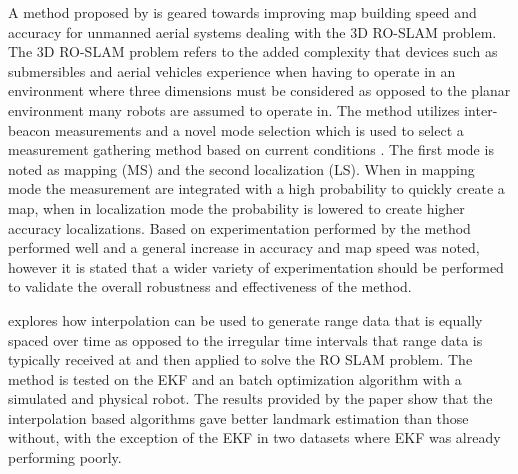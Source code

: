 \documentclass[conference]{IEEEtran}
\begin{document}
	
	
	
	
	
	A method proposed by \cite{Dios2015} is geared towards improving map building speed and accuracy for unmanned aerial systems dealing with the 3D RO-SLAM problem. The 3D RO-SLAM problem refers to the added complexity that devices such as submersibles \cite{Newman} and aerial vehicles experience when having to operate in an environment where three dimensions must be considered as opposed to the planar environment many robots are assumed to operate in. The method utilizes inter-beacon measurements and a novel mode selection which is used to select a measurement gathering method based on current conditions \cite{Dios2015}. The first mode is noted as mapping (MS) and the second localization (LS). When in mapping mode the measurement are integrated with a high probability to quickly create a map, when in localization mode the probability is lowered to create higher accuracy localizations. Based on experimentation performed by \cite{Dios2015} the method performed well and a general increase in accuracy and map speed was noted, however it is stated that a wider variety of experimentation should be performed to validate the overall robustness and effectiveness of the method.
	
	
	
	
	\cite{Kehagias2006} explores how interpolation can be used to generate range data that is equally spaced over time as opposed to the irregular time intervals that range data is typically received at and then applied to solve the RO SLAM problem. The method is tested on the EKF and an batch optimization algorithm with a simulated and physical robot. The results provided by the paper show that the interpolation based algorithms gave better landmark estimation than those without, with the exception of the EKF in two datasets where EKF was already performing poorly.
	
	
	
	
	
\end{document}
